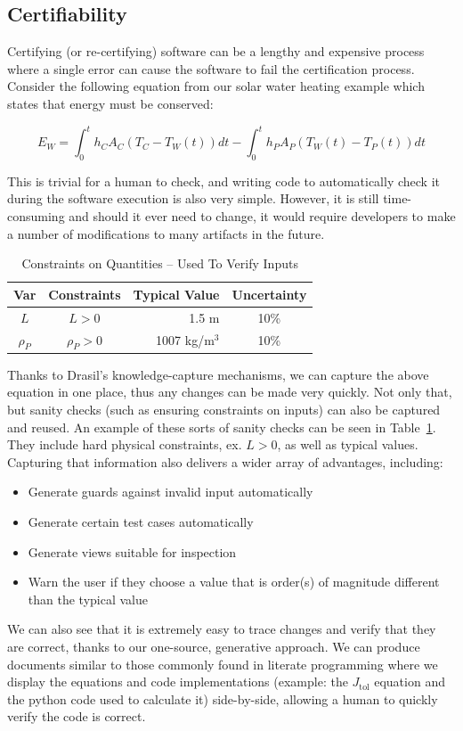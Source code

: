 \documentclass[sigconf]{acmart}
\newcommand{\jtol}{$J_{\mbox{tol}}$}
\begin{document}
\subsection{Certifiability}

Certifying (or re-certifying) software can be a lengthy and expensive process 
where a single error can cause the software to fail the certification process. 
Consider the following equation from our solar water heating example which 
states that energy must be conserved:

\begin{equation*}
E_W = \int_{0}^{t} h_C A_C (T_C - T_W(t)) dt - \int_{0}^{t} h_P A_P (T_W(t) - T_P(t)) dt
\end{equation*}

This is trivial for a human to check, and writing code to automatically check it 
during the software execution is also very simple. However, it is still 
time-consuming and should it ever need to change, it would require developers to 
make a number of modifications to many artifacts in the future.

\begin{table} 
\centering
\caption{Constraints on Quantities -- Used To Verify Inputs}
\begin{tabular}{c c r c } 
\toprule
\textbf{Var} & \textbf{Constraints} & \textbf{Typical Value} & \textbf{Uncertainty}\\ \midrule
$L$ & $L > 0$ & 1.5 m & 10\% \\ 
$\rho_P$ & $\rho_P > 0$	& 1007 kg/m$^3$	& 10\% \\
\bottomrule
\end{tabular}
\label{tab:pcm}
\end{table}

Thanks to Drasil's knowledge-capture mechanisms, we can capture the above 
equation in one place, thus any changes can be made very quickly. Not only 
that, but sanity checks (such as ensuring constraints on inputs) can also be 
captured and reused. An example of these sorts of sanity checks can be seen in 
Table~\ref{tab:pcm}. They include hard physical constraints, ex. $L > 0$, as 
well as typical values. Capturing that information also 
delivers a wider array of advantages, including:

\begin{itemize}
\item Generate guards against invalid input automatically
\item Generate certain test cases automatically
\item Generate views suitable for inspection
\item Warn the user if they choose a value that is order(s) of magnitude different than 
the typical value
\end{itemize}
We can also see that it is extremely easy to trace changes and verify that they 
are correct, thanks to our one-source, generative approach. We can produce 
documents similar to those commonly found in literate programming where we 
display the equations and code implementations (example: the \jtol{} equation 
and the python code used to calculate it) side-by-side, allowing a human to 
quickly verify the code is correct.
\end{document}
